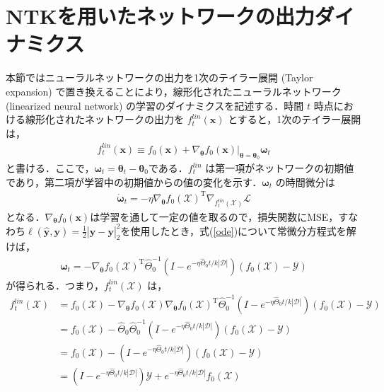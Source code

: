 \documentclass[a4paper]{bxjsarticle}
\theoremstyle{definition}
\begin{document}
\section{NTKを用いたネットワークの出力ダイナミクス}
\label{NTK_dynamics}
本節ではニューラルネットワークの出力を1次のテイラー展開 (Taylor expansion) で置き換えることにより，線形化されたニューラルネットワーク (linearized neural network) の学習のダイナミクスを記述する．時間 $t$ 時点における線形化されたネットワークの出力を $f_t^{lin}(\bm{x})$ とすると，1次のテイラー展開は，
\begin{align}
    f_t^{lin}(\bm{x}) \equiv f_0(\bm{x}) + \nabla_{\bm{\theta}}f_0(\bm{x})|_{\bm{\theta}=\bm{\theta}_0}\bm{\omega}_t \label{f_t_lin}
\end{align}
と書ける．ここで，$\bm{\omega}_t=\bm{\theta}_t - \bm{\theta}_0$である．$f_t^{lin}$ は第一項がネットワークの初期値であり，第二項が学習中の初期値からの値の変化を示す．$\bm{\omega}_t$ の時間微分は
\begin{align}
    \dot{\bm{\omega}}_t = -\eta \nabla_{\bm{\theta}}f_0(\mathcal{X})^{\mathrm{T}}\nabla_{f_t^{lin}(\mathcal{X})}\mathcal{L} \label{ode}
\end{align}
となる．$\nabla_{\bm{\theta}}f_0(\bm{x})$は学習を通して一定の値を取るので，損失関数にMSE，すなわち$\ell(\hat{\bm{y}},\bm{y}) = \frac{1}{2}|\hat{\bm{y}}-\bm{y}|_2^2$を使用したとき，式(\ref{ode})について常微分方程式を解けば，
\begin{align}
    \bm{\omega}_t = -\nabla_{\bm{\theta}}f_0(\mathcal{X})^{\mathrm{T}}\hat{\Theta}_{0}^{-1}\left(I - e^{-\eta\hat{\Theta}_0 t/k|\mathcal{D}|}\right)(f_0(\mathcal{X})- \mathcal{Y})
\end{align}
が得られる．つまり，$f_t^{lin}(\mathcal{X})$ は，
\begin{align}
    f_t^{lin}(\mathcal{X}) &= f_0(\mathcal{X}) - \nabla_{\bm{\theta}}f_0(\mathcal{X})\nabla_{\bm{\theta}}f_0(\mathcal{X})^{\mathrm{T}}\hat{\Theta}_{0}^{-1}\left(I - e^{-\eta\hat{\Theta}_0 t/k|\mathcal{D}|}\right)(f_0(\mathcal{X})- \mathcal{Y}) \\
    &= f_0(\mathcal{X}) - \hat{\Theta}_0 \hat{\Theta}_0^{-1}\left(I - e^{-\eta\hat{\Theta}_0 t/k|\mathcal{D}|}\right)(f_0(\mathcal{X})- \mathcal{Y}) \\
    &= f_0(\mathcal{X}) - \left(I - e^{-\eta\hat{\Theta}_0 t/k|\mathcal{D}|}\right)(f_0(\mathcal{X})- \mathcal{Y}) \\
    &= \left(I - e^{-\eta\hat{\Theta}_0 t/k|\mathcal{D}|}\right)\mathcal{Y} + e^{-\eta\hat{\Theta}_0 t/k|\mathcal{D}|}f_0(\mathcal{X}) \label{ntk_output}
\end{align}
\end{document}
